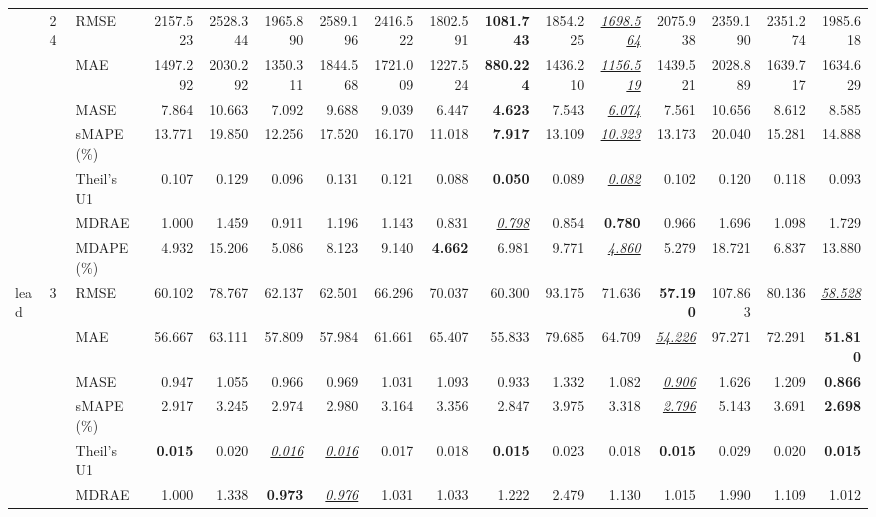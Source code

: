 \begin{table}[!htbp]
{\begin{tabular}{lllrrrrrrrrrrrrr}
\cmidrule(lr){2-16}
 & 24 & RMSE & 2157.523 & 2528.344 & 1965.890 & 2589.196 & 2416.522 & 1802.591 & \textbf{1081.743} & 1854.225 & \underline{\textit{1698.564}} & 2075.938 & 2359.190 & 2351.274 & 1985.618 \\
 &  & MAE & 1497.292 & 2030.292 & 1350.311 & 1844.568 & 1721.009 & 1227.524 & \textbf{880.224} & 1436.210 & \underline{\textit{1156.519}} & 1439.521 & 2028.889 & 1639.717 & 1634.629 \\
 &  & MASE & 7.864 & 10.663 & 7.092 & 9.688 & 9.039 & 6.447 & \textbf{4.623} & 7.543 & \underline{\textit{6.074}} & 7.561 & 10.656 & 8.612 & 8.585 \\
 &  & sMAPE (\%) & 13.771 & 19.850 & 12.256 & 17.520 & 16.170 & 11.018 & \textbf{7.917} & 13.109 & \underline{\textit{10.323}} & 13.173 & 20.040 & 15.281 & 14.888 \\
 &  & Theil's U1 & 0.107 & 0.129 & 0.096 & 0.131 & 0.121 & 0.088 & \textbf{0.050} & 0.089 & \underline{\textit{0.082}} & 0.102 & 0.120 & 0.118 & 0.093 \\
 &  & MDRAE & 1.000 & 1.459 & 0.911 & 1.196 & 1.143 & 0.831 & \underline{\textit{0.798}} & 0.854 & \textbf{0.780} & 0.966 & 1.696 & 1.098 & 1.729 \\
 &  & MDAPE (\%) & 4.932 & 15.206 & 5.086 & 8.123 & 9.140 & \textbf{4.662} & 6.981 & 9.771 & \underline{\textit{4.860}} & 5.279 & 18.721 & 6.837 & 13.880 \\
\midrule
lead & 3 & RMSE & 60.102 & 78.767 & 62.137 & 62.501 & 66.296 & 70.037 & 60.300 & 93.175 & 71.636 & \textbf{57.190} & 107.863 & 80.136 & \underline{\textit{58.528}} \\
 &  & MAE & 56.667 & 63.111 & 57.809 & 57.984 & 61.661 & 65.407 & 55.833 & 79.685 & 64.709 & \underline{\textit{54.226}} & 97.271 & 72.291 & \textbf{51.810} \\
 &  & MASE & 0.947 & 1.055 & 0.966 & 0.969 & 1.031 & 1.093 & 0.933 & 1.332 & 1.082 & \underline{\textit{0.906}} & 1.626 & 1.209 & \textbf{0.866} \\
 &  & sMAPE (\%) & 2.917 & 3.245 & 2.974 & 2.980 & 3.164 & 3.356 & 2.847 & 3.975 & 3.318 & \underline{\textit{2.796}} & 5.143 & 3.691 & \textbf{2.698} \\
 &  & Theil's U1 & \textbf{0.015} & 0.020 & \underline{\textit{0.016}} & \underline{\textit{0.016}} & 0.017 & 0.018 & \textbf{0.015} & 0.023 & 0.018 & \textbf{0.015} & 0.029 & 0.020 & \textbf{0.015} \\
 &  & MDRAE & 1.000 & 1.338 & \textbf{0.973} & \underline{\textit{0.976}} & 1.031 & 1.033 & 1.222 & 2.479 & 1.130 & 1.015 & 1.990 & 1.109 & 1.012 \\

\end{tabular}}
\end{table}
